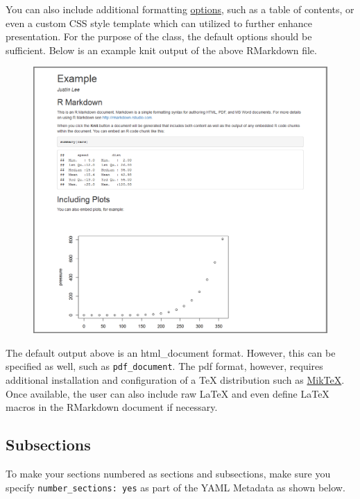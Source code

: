\documentclass[]{book}
\theoremstyle{definition}
\theoremstyle{definition}
\theoremstyle{remark}
\begin{document}
You can also include additional formatting
\href{http://rmarkdown.rstudio.com/html_document_format.html}{options},
such as a table of contents, or even a custom CSS style template which
can utilized to further enhance presentation. For the purpose of the
class, the default options should be sufficient. Below is an example
knit output of the above RMarkdown file.

\begin{figure}[htbp]
\centering
\includegraphics{images/rmd_example_output.png}
\caption{}
\end{figure}

The default output above is an html\_document format. However, this can
be specified as well, such as \texttt{pdf\_document}. The pdf format,
however, requires additional installation and configuration of a TeX
distribution such as \href{https://miktex.org/2.9/setup}{MikTeX}. Once
available, the user can also include raw LaTeX and even define LaTeX
macros in the RMarkdown document if necessary.

\subsection{Subsections}\label{subsections}

To make your sections numbered as sections and subsections, make sure
you specify \texttt{number\_sections:\ yes} as part of the YAML Metadata
as shown below.
\end{document}
